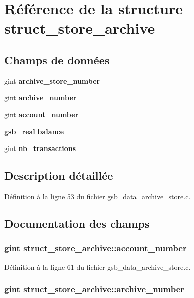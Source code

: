 \section{Référence de la structure struct\_\-store\_\-archive}
\label{structstruct__store__archive}
\subsection*{Champs de données}
\begin{DoxyCompactItemize}
\item 
gint {\bf archive\_\-store\_\-number}
\item 
gint {\bf archive\_\-number}
\item 
gint {\bf account\_\-number}
\item 
{\bf gsb\_\-real} {\bf balance}
\item 
gint {\bf nb\_\-transactions}
\end{DoxyCompactItemize}


\subsection{Description détaillée}


Définition à la ligne 53 du fichier gsb\_\-data\_\-archive\_\-store.c.



\subsection{Documentation des champs}
\subsubsection[{account\_\-number}]{\setlength{\rightskip}{0pt plus 5cm}gint {\bf struct\_\-store\_\-archive::account\_\-number}}\label{structstruct__store__archive_a7195210870c7166259d0c863e70376aa}


Définition à la ligne 61 du fichier gsb\_\-data\_\-archive\_\-store.c.

\subsubsection[{archive\_\-number}]{\setlength{\rightskip}{0pt plus 5cm}gint {\bf struct\_\-store\_\-archive::archive\_\-number}}\label{structstruct__store__archive_a7aa1c5699a50444849a12c2edfac8fc0}



